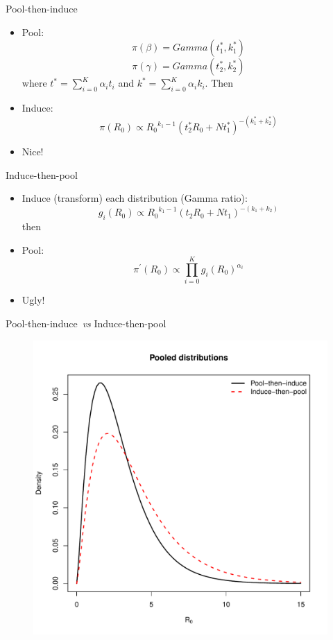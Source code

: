 \begin{frame}{Pool-then-induce}
\begin{itemize}
 \item Pool:
 \[ \pi(\beta) = Gamma(t_{1}^*, k_{1}^*) \]
 \[ \pi(\gamma) = Gamma(t_{2}^*, k_{2}^*) \]
 where $t^* = \sum_{i= 0}^K \alpha_i t_i$ and $k^* = \sum_{i= 0}^K \alpha_i k_i$.
Then
\item Induce:
\[ \pi(R_0) \propto  {R_0}^{k_1-1} (t_{2}^* R_0 + Nt_{1}^*)^{-(k_{1}^* +  k_{2}^*)}\]
\item Nice! 
\end{itemize}
\end{frame}
\begin{frame}{Induce-then-pool}
\begin{itemize}
 \item Induce (transform) each distribution (Gamma ratio):
 \[ g_{i}(R_0) \propto  {R_0}^{k_1-1} (t_2 R_0 + Nt_1)^{-(k_1 + k_2)} \]
 then
\item Pool:
\[ \pi^\prime(R_0)  \propto \prod_{i = 0}^K g_{i}(R_0) ^{\alpha_i}\]
\item Ugly!
\end{itemize}
\end{frame}
\begin{frame}{Pool-then-induce~\textit{vs} Induce-then-pool}
 \begin{figure}
 \begin{center}
  \includegraphics[scale=0.4]{figures/ItP_vs_PtI_equalWeights.pdf}
 \end{center}
  \end{figure}
\end{frame}
